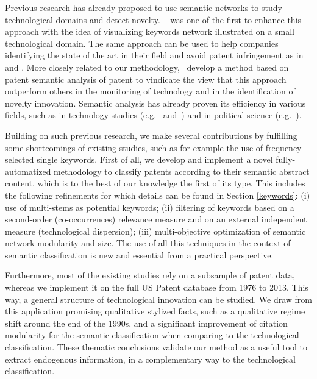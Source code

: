 \documentclass[10pt,A4,draft]{article}
\begin{document}
Previous research has already proposed to use semantic networks to study technological domains and detect novelty. ~\cite{yoon2004text} was one of the first to enhance this approach with the idea of visualizing keywords network illustrated on a small technological domain. The same approach can be used to help companies identifying the state of the art in their field and avoid patent infringement as in \cite{park2014semantic} and \cite{yoon2011detecting}. More closely related to our methodology,~\cite{gerken2012new} develop a method based on patent semantic analysis of patent to vindicate the view that this approach outperform others in the monitoring of technology and in the identification of novelty innovation. Semantic analysis has already proven its efficiency in various fields, such as in technology studies (e.g.~\cite{choi2014patent} and~\cite{fattori2003text}) and in political science (e.g.~\cite{2015arXiv151003797G}).


Building on such previous research, we make several contributions by fulfilling some shortcomings of existing studies, such as for example the use of frequency-selected single keywords. First of all, we develop and implement a novel fully-automatized methodology to classify patents according to their semantic abstract content, which is to the best of our knowledge the first of its type. This includes the following refinements for which details can be found in Section \ref{keywords}: (i) use of multi-stems as potential keywords; (ii) filtering of keywords based on a second-order (co-occurrences) relevance measure and on an external independent measure (technological dispersion); (iii) multi-objective optimization of semantic network modularity and size. The use of all this techniques in the context of semantic classification is new and essential from a practical perspective. 

Furthermore, most of the existing studies rely on a subsample of patent data, whereas we implement it on the full US Patent database from 1976 to 2013. This way, a general structure of technological innovation can be studied. We draw from this application promising qualitative stylized facts, such as a qualitative regime shift around the end of the 1990s, and a significant improvement of citation modularity for the semantic classification when comparing to the technological classification. These thematic conclusions validate our method as a useful tool to extract endogenous information, in a complementary way to the technological classification.
\end{document}
